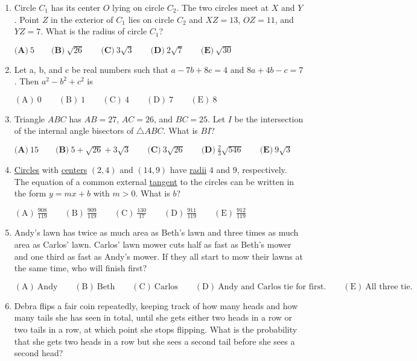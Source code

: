\documentclass{article}%
\begin{document}
\begin{enumerate}
%
\item%
Circle $C_1$ has its center $O$ lying on circle $C_2$.  The two circles meet at $X$ and $Y$.  Point $Z$ in the exterior of $C_1$ lies on circle $C_2$ and $XZ=13$, $OZ=11$, and $YZ=7$.  What is the radius of circle $C_1$?

$\textbf{(A)}\ 5\qquad\textbf{(B)}\ \sqrt{26}\qquad\textbf{(C)}\ 3\sqrt{3}\qquad\textbf{(D)}\ 2\sqrt{7}\qquad\textbf{(E)}\ \sqrt{30}$

%
\item%
Let a, b, and c be real numbers such that $a-7b+8c=4$ and $8a+4b-c=7$. Then $a^2-b^2+c^2$ is 

$\mathrm{(A)\ }0\qquad\mathrm{(B)\ }1\qquad\mathrm{(C)\ }4\qquad\mathrm{(D)\ }7\qquad\mathrm{(E)\ }8$

%
\item%
Triangle $ABC$ has $AB=27$, $AC=26$, and $BC=25$.  Let $I$ be the intersection of the internal angle bisectors of $\triangle ABC$.  What is $BI$?

$\textbf{(A)}\ 15\qquad\textbf{(B)}\ 5+\sqrt{26}+3\sqrt{3}\qquad\textbf{(C)}\ 3\sqrt{26}\qquad\textbf{(D)}\ \frac{2}{3}\sqrt{546}\qquad\textbf{(E)}\ 9\sqrt{3}$

%
\item%
\href{/wiki/index.php/Circle}{Circles} with \href{/wiki/index.php/Center_(geometry)}{ centers} $(2,4)$ and $(14,9)$ have \href{/wiki/index.php/Radius}{ radii} $4$ and $9$, respectively. The equation of a common external \href{/wiki/index.php/Tangent_line}{tangent} to the circles can be written in the form $y=mx+b$ with $m>0$. What is $b$?

$\mathrm{(A) \ } \frac{908}{119}\qquad \mathrm{(B) \ } \frac{909}{119}\qquad \mathrm{(C) \ } \frac{130}{17}\qquad \mathrm{(D) \ } \frac{911}{119}\qquad \mathrm{(E) \ }  \frac{912}{119}$

%
\item%
Andy's lawn has twice as much area as Beth's lawn and three times as much area as Carlos' lawn. Carlos' lawn mower cuts half as fast as Beth's mower and one third as fast as Andy's mower. If they all start to mow their lawns at the same time, who will finish first?

$\mathrm{(A)}\ \text{Andy} \qquad\mathrm{(B)}\ \text{Beth} \qquad\mathrm{(C)}\ \text{Carlos} \qquad\mathrm{(D)}\ \text{Andy\ and \ Carlos\ tie\ for\ first.} \qquad\mathrm{(E)}\ \text{All\ three\ tie.}$

%
\item%
Debra flips a fair coin repeatedly, keeping track of how many heads and how many tails she has seen in total, until she gets either two heads in a row or two tails in a row, at which point she stops flipping. What is the probability that she gets two heads in a row but she sees a second tail before she sees a second head?


\end{enumerate}
\end{document}

